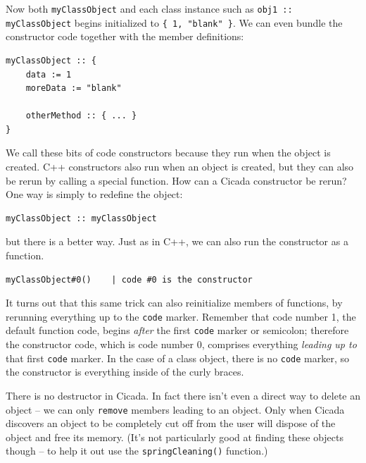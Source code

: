 \documentclass{article}
\newenvironment{code}{
       \begin{list}{}{
               \setlength{\leftmargin}{.4in}
               \setlength{\rightmargin}{0in}
               \setlength{\topsep}{.2in}
       }
       \small
       \item[] }
       { \end{list}   }
\begin{document}
\noindent Now both \verb#myClassObject# and each class instance such as \verb#obj1 :: myClassObject# begins initialized to \verb${ 1, "blank" }$.  We can even bundle the constructor code together with the member definitions:

\begin{code} \begin{verbatim}
myClassObject :: {
    data := 1
    moreData := "blank"
    
    otherMethod :: { ... }
}
\end{verbatim} \end{code}

We call these bits of code constructors because they run when the object is created.  C++ constructors also run when an object is created, but they can also be rerun by calling a special function.  How can a Cicada constructor be rerun?  One way is simply to redefine the object:

\begin{code} \begin{verbatim}
myClassObject :: myClassObject
\end{verbatim} \end{code}

\noindent but there is a better way.  Just as in C++, we can also run the constructor as a function.

\begin{code} \begin{verbatim}
myClassObject#0()    | code #0 is the constructor
\end{verbatim} \end{code}

\noindent It turns out that this same trick can also reinitialize members of functions, by rerunning everything up to the \verb#code# marker.  Remember that code number 1, the default function code, begins \emph{after} the first \verb#code# marker or semicolon; therefore the constructor code, which is code number 0, comprises everything \emph{leading up to} that first \verb#code# marker.  In the case of a class object, there is no \verb#code# marker, so the constructor is everything inside of the curly braces.

There is no destructor in Cicada.  In fact there isn't even a direct way to delete an object -- we can only \verb#remove# members leading to an object.  Only when Cicada discovers an object to be completely cut off from the user will dispose of the object and free its memory.  (It's not particularly good at finding these objects though -- to help it out use the \texttt{springCleaning()} function.)
\end{document}
